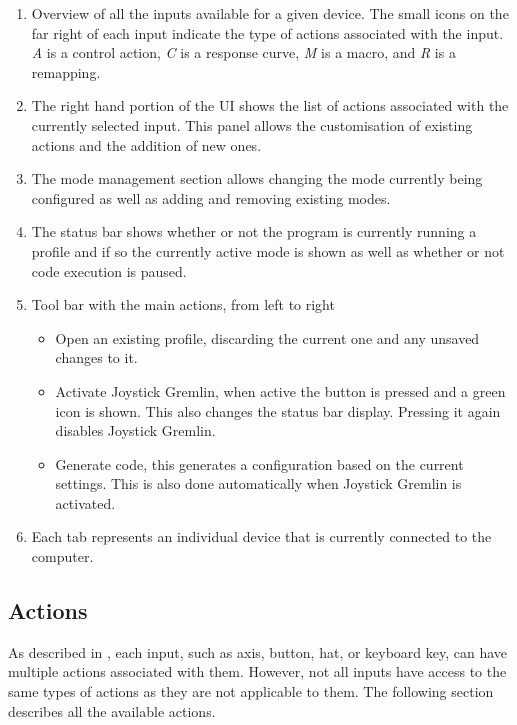 \documentclass[a4, 10pt]{article}
\newcommand{\JG}{Joystick Gremlin}
\begin{document}
\begin{enumerate}
    \item Overview of all the inputs available for a given device. The
        small icons on the far right of each input indicate the type of
        actions associated with the input. \emph{A} is a control action,
        \emph{C} is a response curve, \emph{M} is a macro, and \emph{R} is
        a remapping.
    \item The right hand portion of the UI shows the list of actions
        associated with the currently selected input. This panel allows
        the customisation of existing actions and the addition of new
        ones.
    \item The mode management section allows changing the mode currently
        being configured as well as adding and removing existing modes.
    \item The status bar shows whether or not the program is currently
        running a profile and if so the currently active mode is shown
        as well as whether or not code execution is paused.
    \item Tool bar with the main actions, from left to right
        \begin{itemize}
            \item Open an existing profile, discarding the current one
                and any unsaved changes to it.
            \item Activate \JG{}, when active the button is pressed and
                a green icon is shown. This also changes the status bar
                display. Pressing it again disables \JG{}.
            \item Generate code, this generates a configuration based on
                the current settings. This is also done automatically
                when \JG{} is activated.
        \end{itemize}
    \item Each tab represents an individual device that is currently
        connected to the computer.
\end{enumerate}


\subsection{Actions}

As described in , each input, such as axis, button,
hat, or keyboard key, can have multiple actions associated with them.
However, not all inputs have access to the same types of actions as they
are not applicable to them. The following section describes all the
available actions.
\end{document}

